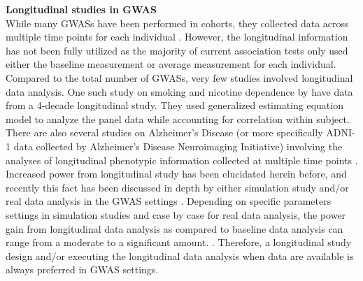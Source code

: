 \documentclass[12pt]{article}
\begin{document}
%


\textbf{Longitudinal studies in GWAS}\\
While many GWASs have been performed in cohorts, they collected data across multiple time points for each individual \cite{Aulchenko2009,Ionita-Laza2007,Kamatani2010,Kathiresan2007,Sabatti2008}. However, the longitudinal information has not been fully utilized as the majority of current association tests only used either the baseline measurement or average measurement for each individual\cite{Sabatti2008,Ionita-Laza2007,Kamatani2010,Kathiresan2007}. Compared to the total number of GWASs, very few studies involved longitudinal data analysis. One such study on smoking and nicotine dependence by \cite{Belsky2013} have data from a 4-decade longitudinal study. They used generalized estimating equation model to analyze the panel data while accounting for correlation within subject. There are also several studies on Alzheimer's Disease (or more specifically ADNI-1 data collected by Alzheimer's Disease Neuroimaging Initiative) involving the analyses of longitudinal phenotypic information collected at multiple time points \cite{Wang2012,Melville2012,Silver2012}. Increased power from longitudinal study has been elucidated herein before, and recently this fact has been discussed in depth by either simulation study and/or real data analysis in the GWAS settings \cite{Xu2014,Furlotte2012}. Depending on specific parameters settings in simulation studies and case by case for real data analysis, the power gain from longitudinal data analysis as compared to baseline data analysis can range from a moderate to a significant amount. \cite{Xu2014,Furlotte2012}. Therefore, a longitudinal study design and/or executing the longitudinal data analysis when data are available is always preferred in GWAS settings.
\end{document}
